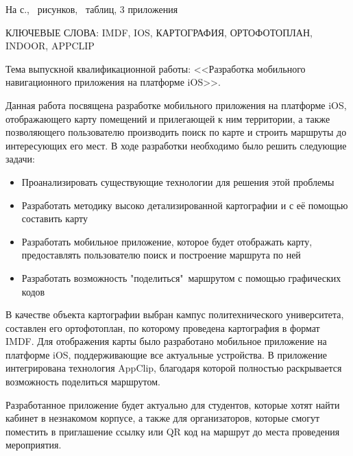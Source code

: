 \noindent На \pageref{LastPage} с., \totalfigures\ рисунков, \totaltables\ таблиц, 3 приложения

\MakeUppercase{
  ключевые слова: imdf, ios, картография, ортофотоплан, indoor, appclip
}

Тема выпускной квалификационной работы: <<Разработка мобильного навигационного приложения на платформе iOS>>.

Данная работа посвящена разработке мобильного приложения на платформе iOS, отображающего карту помещений и прилегающей к ним территории, а также позволяющего пользователю производить поиск по карте и строить маршруты до интересующих его мест.
В ходе разработки необходимо было решить следующие задачи:
\begin{itemize}
  \item Проанализировать существующие технологии для решения этой проблемы
  \item Разработать методику высоко детализированной картографии и с её помощью составить карту
  \item Разработать мобильное приложение, которое будет отображать карту, предоставлять пользователю поиск и построение маршрута по ней
  \item Разработать возможность "поделиться"\ маршрутом с помощью графических кодов
\end{itemize}

В качестве объекта картографии выбран кампус политехнического университета, составлен его ортофотоплан, по которому проведена картография в формат IMDF. Для отображения карты было разработано мобильное приложение на платформе iOS, поддерживающие все актуальные устройства. В приложение интегрирована технология AppClip, благодаря которой полностью раскрывается возможность поделиться маршрутом.

Разработанное приложение будет актуально для студентов, которые хотят найти кабинет в незнакомом корпусе, а также для организаторов, которые смогут поместить в приглашение ссылку или QR код на маршрут до места проведения мероприятия.
